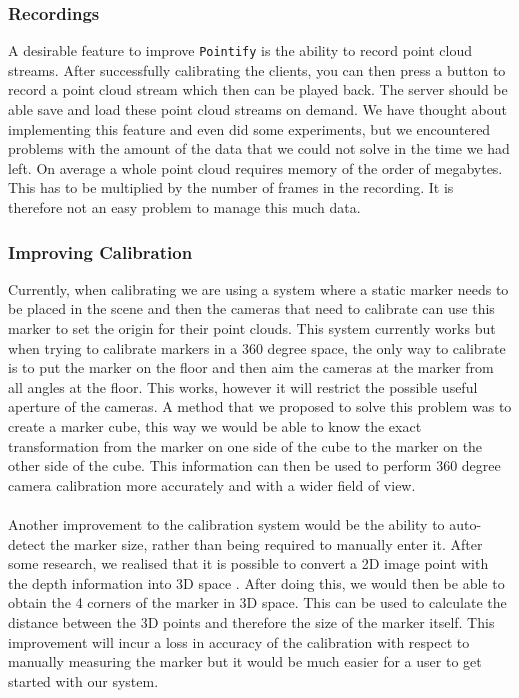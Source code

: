 \documentclass{article}
\begin{document}
\subsubsection{Recordings}
A desirable feature to improve \texttt{Pointify} is the ability to record point cloud streams. After successfully calibrating the clients, you can then press a button to record a point cloud stream which then can be played back. The server should be able save and load these point cloud streams on demand. We have thought about implementing this feature and even did some experiments, but we encountered problems with the amount of the data that we could not solve in the time we had left. On average a whole point cloud requires memory of the order of megabytes. This has to be multiplied by the number of frames in the recording. It is therefore not an easy problem to manage this much data. 
\subsubsection{Improving Calibration}
Currently, when calibrating we are using a system where a static marker needs to be placed in the scene and then the cameras that need to calibrate can use this marker to set the origin for their point clouds. This system currently works but when trying to calibrate markers in a 360 degree space, the only way to calibrate is to put the marker on the floor and then aim the cameras at the marker from all angles at the floor. This works, however it will restrict the possible useful aperture of the cameras. A method that we proposed to solve this problem was to create a marker cube, this way we would be able to know the exact transformation from the marker on one side of the cube to the marker on the other side of the cube. This information can then be used to perform 360 degree camera calibration more accurately and with a wider field of view.
\\\\
Another improvement to the calibration system would be the ability to auto-detect the marker size, rather than being required to manually enter it. After some research, we realised that it is possible to convert a 2D image point with the depth information into 3D space \cite{2dto3d}. After doing this, we would then be able to obtain the 4 corners of the marker in 3D space. This can be used to calculate the distance between the 3D points and therefore the size of the marker itself. This improvement will incur a loss in accuracy of the calibration with respect to manually measuring the marker but it would be much easier for a user to get started with our system.
\end{document}
